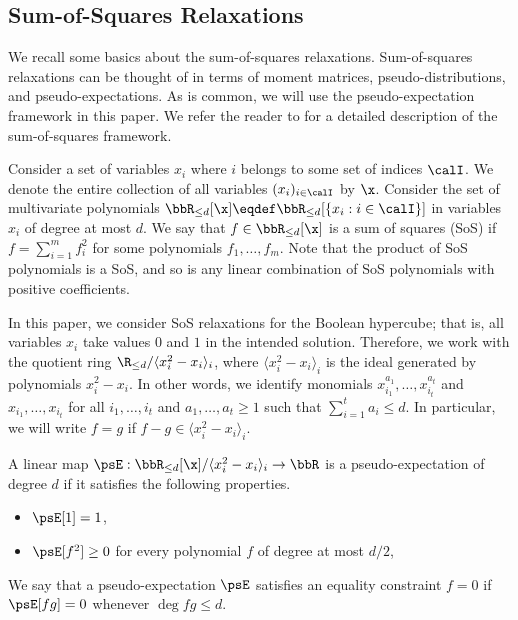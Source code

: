 \documentclass[11pt,a4paper]{article}
\begin{document}
\subsection{Sum-of-Squares Relaxations}
We recall some basics about the sum-of-squares relaxations. Sum-of-squares relaxations can be thought of in terms of moment matrices, pseudo-distributions, and pseudo-expectations. As is common, we will use the pseudo-expectation framework in this paper. We refer the reader to \cite{FKP19} for a detailed description of the sum-of-squares framework.

Consider a set of variables $x_i$ where $i$ belongs to some set of indices $\calI$.  We denote the entire collection of all variables $(x_i)_{i\in \calI}$ by $\x$. Consider the set of multivariate polynomials $\bbR_{\leq d} [\x] \eqdef \bbR_{\leq d} [\{x_i:i\in \calI\}]$ in variables $x_i$ of degree at most $d$. We say that $f\in\bbR_{\leq d} [\x]$ is a sum of squares (SoS) if \(f = \sum_{i=1}^m f_i^2\) for some polynomials $f_1,\dots, f_m$. Note that the product of SoS polynomials is a SoS, and so is any linear combination of SoS polynomials with positive coefficients.

In this paper, we consider SoS relaxations for the Boolean hypercube; that is, all variables $x_i$ take values $0$ and $1$ in the intended solution. Therefore, we work with the quotient ring $\R_{\leq d}/\langle x_i^2 -x_i\rangle_i$, where $\langle x_i^2 -x_i\rangle_i$ is the ideal generated by polynomials $x_i^2 - x_i$. In other words, we identify monomials $x_{i_1}^{a_1}, \dots, x_{i_t}^{a_t}$ and $x_{i_1},\dots, x_{i_t}$ for all $i_1,\dots, i_t$ and $a_1,\dots, a_t \geq 1$ such that $\sum_{i=1}^t a_i \leq d$. In particular, we will write $f=g$ if $f-g\in \langle x_i^2 -x_i\rangle_i$.

\begin{definition}
A linear map $\psE: \bbR_{\leq d} [\x]/\langle x_i^2 -x_i\rangle_i \to \bbR$ is a pseudo-expectation of degree $d$ if it satisfies the following properties.
\begin{itemize}
\item $\psE[1] = 1$,
\item $\psE[f^2] \geq 0$ for every polynomial $f$ of degree at most $d/2$,
\end{itemize}
We say that a pseudo-expectation $\psE$ satisfies an equality constraint $f = 0$ if $\psE[fg] = 0$ whenever $\deg fg \leq d$.
\end{definition}
\end{document}
